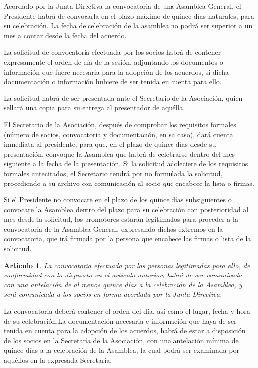 \documentclass[a4paper,12pt]{article}
\theoremstyle{mystyle}		%
\newtheorem{art}{Artículo}	%
\begin{document}
\begin{onehalfspace}
Acordado por la Junta Directiva la convocatoria de una Asamblea General, el Presidente habrá de convocarla en el plazo máximo de quince días naturales, para su celebración. La fecha de celebración de la asamblea no podrá ser superior a un mes a contar desde la fecha del acuerdo.

La solicitud de convocatoria efectuada por los socios habrá de contener expresamente el orden de día de la sesión, adjuntando los documentos o información que fuere necesaria para la adopción de los acuerdos, si dicha documentación o información hubiere de ser tenida en cuenta para ello.

La solicitud habrá de ser presentada ante el Secretario de la Asociación, quien sellará una copia para su entrega al presentador de aquélla.

El Secretario de la Asociación, después de comprobar los requisitos formales (número de socios, convocatoria y documentación, en su caso), dará cuenta inmediata al presidente, para que, en el plazo de quince días desde su presentación, convoque la Asamblea que habrá de celebrarse dentro del mes siguiente a la fecha de la presentación. Si la solicitud adoleciere de los requisitos formales antecitados, el Secretario tendrá por no formulada la solicitud, procediendo a su archivo con comunicación al socio que encabece la lista o firmas.

Si el Presidente no convocare en el plazo de los quince días subsiguientes o convocare la Asamblea dentro del plazo para su celebración con posterioridad al mes desde la solicitud, los promotores estarán legitimados para proceder a la convocatoria de la Asamblea General, expresando dichos extremos en la convocatoria, que irá firmada por la persona que encabece las firmas o lista de la solicitud.

\begin{art}
La convocatoria efectuada por las personas legitimadas para ello, de conformidad con lo dispuesto en el artículo anterior, habrá de ser comunicada con una antelación de al menos quince días a la celebración de la Asamblea, y será comunicada a los socios en forma acordada por la Junta Directiva.
\end{art}

La convocatoria deberá contener el orden del día, así como el lugar, fecha y hora de su celebración.La documentación necesaria e información que haya de ser tenida en cuenta para la adopción de los acuerdos, habrá de estar a disposición de los socios en la Secretaría de la Asociación, con una antelación mínima de quince días a la celebración de la Asamblea, la cual podrá ser examinada por aquéllos en la expresada Secretaría.


\end{onehalfspace}
\end{document}
